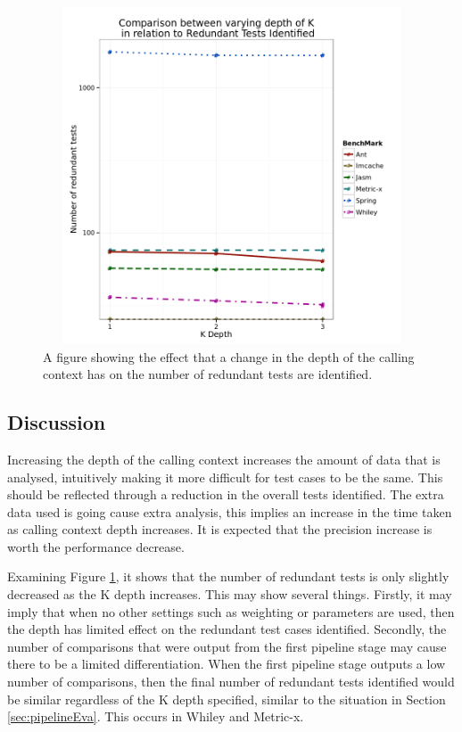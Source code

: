 \begin{figure}[h]
\begin{center}
\includegraphics[height=10cm, width = 14.5cm]{KDepth.png}
\end{center}
\caption{A figure showing the effect that a change in the depth of the calling context has on the number of redundant tests are identified.}
\label{fig:kdepthgraph}
\end{figure}

\subsection{Discussion}
Increasing the depth of the calling context increases the amount of data that is analysed, intuitively making it more difficult for test cases to be the same. This should be reflected through a reduction in the overall tests identified. The extra data used is going cause extra analysis, this implies an increase in the time taken as calling context depth increases. It is expected that the precision increase is worth the performance decrease.

Examining Figure \ref{fig:kdepthgraph}, it shows that the number of redundant tests is only slightly decreased as the K depth increases. This may show several things. Firstly, it may imply that when no other settings such as weighting or parameters are used, then the depth has limited effect on the redundant test cases identified. Secondly, the number of comparisons that were output from the first pipeline stage may cause there to be a limited differentiation. When the first pipeline stage outputs a low number of comparisons, then the final number of redundant tests identified would be similar regardless of the K depth specified, similar to the situation in Section \ref{sec:pipelineEva}. This occurs in Whiley and Metric-x. 

